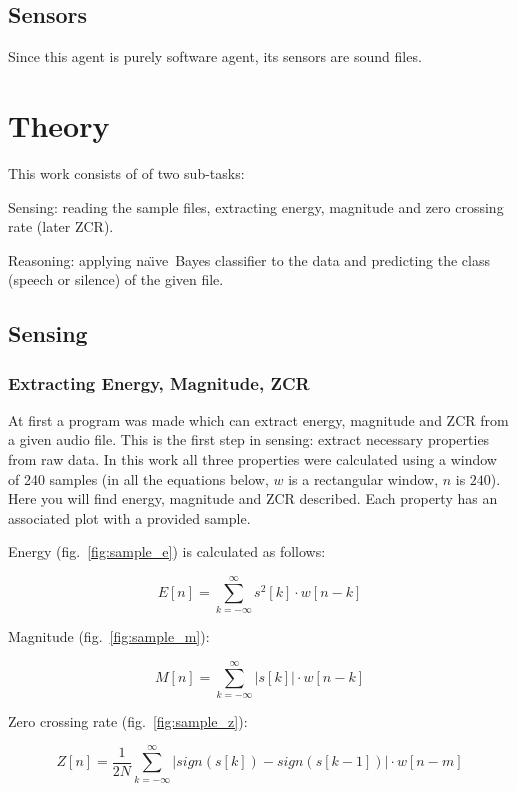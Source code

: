 \documentclass[english,11pt]{article}
\numberwithin{equation}{section}
\newcommand{\naive}{na\"{\i}ve\ }
\begin{document}
\subsection{Sensors}
Since this agent is purely software agent, its sensors are sound files.

\section{Theory}

This work consists of of two sub-tasks:
\begin{description}
    \item{Sensing:} reading the sample files, extracting energy, magnitude and
        zero crossing rate (later ZCR).

    \item{Reasoning:} applying \naive Bayes classifier to the data and
        predicting the class (speech or silence) of the given file.
\end{description}

\subsection{Sensing}

\subsubsection{Extracting Energy, Magnitude, ZCR}

At first a program was made which can extract energy, magnitude and ZCR from a
given audio file. This is the first step in sensing: extract necessary
properties from raw data. In this work all three properties were calculated
using a window of 240 samples (in all the equations below, $w$ is a rectangular
window, $n$ is $240$). Here you will find energy, magnitude and ZCR described.
Each property has an associated plot with a provided sample.

Energy (fig.~\ref{fig:sample_e}) is calculated as follows:

$$ E[n] = \sum_{k=-\infty}^{\infty} s^2[k] \cdot w[n-k] $$

Magnitude (fig.~\ref{fig:sample_m}):

$$ M[n] = \sum_{k=-\infty}^{\infty} |s[k]| \cdot w[n-k] $$

Zero crossing rate (fig.~\ref{fig:sample_z}):

$$
    Z[n] = \frac{1}{2N}
        \sum_{k=-\infty}^{\infty}
        |sign(s[k]) - sign(s[k-1])| \cdot w[n-m]
$$
\end{document}
